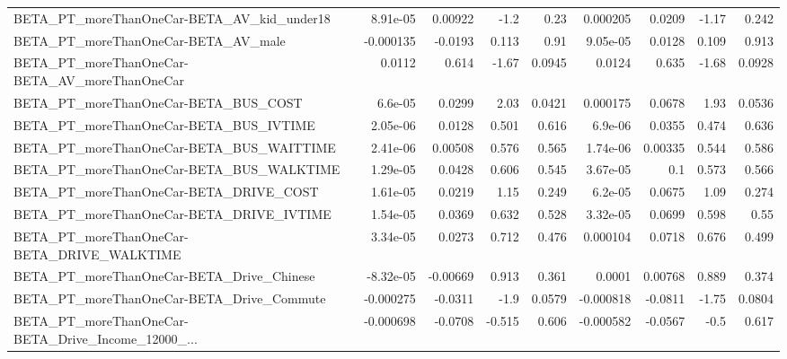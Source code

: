 \begin{tabular}{lrrrrrrrr}
BETA\_PT\_moreThanOneCar-BETA\_AV\_kid\_under18         &    8.91e-05 &      0.00922 &     -1.2 &     0.23 &   0.000205 &      0.0209 &        -1.17 &         0.242 \\
BETA\_PT\_moreThanOneCar-BETA\_AV\_male                &   -0.000135 &      -0.0193 &    0.113 &     0.91 &   9.05e-05 &      0.0128 &        0.109 &         0.913 \\
BETA\_PT\_moreThanOneCar-BETA\_AV\_moreThanOneCar      &      0.0112 &        0.614 &    -1.67 &   0.0945 &     0.0124 &       0.635 &        -1.68 &        0.0928 \\
BETA\_PT\_moreThanOneCar-BETA\_BUS\_COST               &     6.6e-05 &       0.0299 &     2.03 &   0.0421 &   0.000175 &      0.0678 &         1.93 &        0.0536 \\
BETA\_PT\_moreThanOneCar-BETA\_BUS\_IVTIME             &    2.05e-06 &       0.0128 &    0.501 &    0.616 &    6.9e-06 &      0.0355 &        0.474 &         0.636 \\
BETA\_PT\_moreThanOneCar-BETA\_BUS\_WAITTIME           &    2.41e-06 &      0.00508 &    0.576 &    0.565 &   1.74e-06 &     0.00335 &        0.544 &         0.586 \\
BETA\_PT\_moreThanOneCar-BETA\_BUS\_WALKTIME           &    1.29e-05 &       0.0428 &    0.606 &    0.545 &   3.67e-05 &         0.1 &        0.573 &         0.566 \\
BETA\_PT\_moreThanOneCar-BETA\_DRIVE\_COST             &    1.61e-05 &       0.0219 &     1.15 &    0.249 &    6.2e-05 &      0.0675 &         1.09 &         0.274 \\
BETA\_PT\_moreThanOneCar-BETA\_DRIVE\_IVTIME           &    1.54e-05 &       0.0369 &    0.632 &    0.528 &   3.32e-05 &      0.0699 &        0.598 &          0.55 \\
BETA\_PT\_moreThanOneCar-BETA\_DRIVE\_WALKTIME         &    3.34e-05 &       0.0273 &    0.712 &    0.476 &   0.000104 &      0.0718 &        0.676 &         0.499 \\
BETA\_PT\_moreThanOneCar-BETA\_Drive\_Chinese          &   -8.32e-05 &     -0.00669 &    0.913 &    0.361 &     0.0001 &     0.00768 &        0.889 &         0.374 \\
BETA\_PT\_moreThanOneCar-BETA\_Drive\_Commute          &   -0.000275 &      -0.0311 &     -1.9 &   0.0579 &  -0.000818 &     -0.0811 &        -1.75 &        0.0804 \\
BETA\_PT\_moreThanOneCar-BETA\_Drive\_Income\_12000\_... &   -0.000698 &      -0.0708 &   -0.515 &    0.606 &  -0.000582 &     -0.0567 &         -0.5 &         0.617 \\

\end{tabular}
